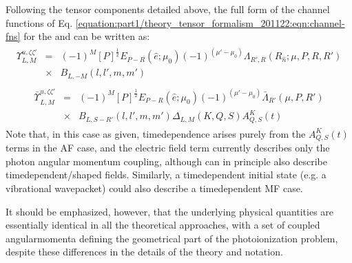 \documentclass[letterpaper,table,10pt,english]{jupyterBook}
\begin{document}
\sphinxAtStartPar
Following the tensor components detailed above, the full form of the channel functions of Eq. \eqref{equation:part1/theory_tensor_formalism_201122:eqn:channel-fns} for the {\hyperref[\detokenize{backmatter/glossary:term-AF}]{}} and {\hyperref[\detokenize{backmatter/glossary:term-MF}]{}} can be written as:
\begin{equation}\label{equation:part1/theory_tensor_formalism_201122:eq:channelFunc-MF-defn}
\begin{split}
\begin{aligned}
\varUpsilon_{L,M}^{u,\zeta\zeta'} & = & (-1)^{M}{[P]^{\frac{1}{2}}}E_{P-R}(\hat{e};\mu_{0})(-1)^{(\mu'-\mu_{0})}\Lambda_{R',R}(R_{\hat{n}};\mu,P,R,R')\\
 & \times & B_{L,-M}(l,l',m,m')\end{aligned}
\end{split}
\end{equation}\begin{equation}\label{equation:part1/theory_tensor_formalism_201122:eq:channelFunc-AF-defn}
\begin{split}
\begin{aligned}
\bar{\varUpsilon_{}}_{L,M}^{u,\zeta\zeta'} & = & (-1)^{M}[P]^{\frac{1}{2}}E_{P-R}(\hat{e};\mu_{0})(-1)^{(\mu'-\mu_{0})}\bar{\Lambda}_{R'}(\mu,P,R')\\
 & \times & B_{L,S-R'}(l,l',m,m')\Delta_{L,M}(K,Q,S)A_{Q,S}^{K}(t)\end{aligned}
\end{split}
\end{equation}
\sphinxAtStartPar
Note that, in this case as given, time\sphinxhyphen{}dependence arises purely from the
\(A_{Q,S}^{K}(t)\) terms in the AF case, and the electric field term
currently describes only the photon angular momentum coupling, although
can in principle also describe time\sphinxhyphen{}dependent/shaped fields. Similarly,
a time\sphinxhyphen{}dependent initial state (e.g. a vibrational wavepacket) could
also describe a time\sphinxhyphen{}dependent MF case.

\sphinxAtStartPar
It should be emphasized, however, that the underlying physical
quantities are essentially identical in all the theoretical approaches,
with a set of coupled angular\sphinxhyphen{}momenta defining the geometrical part of
the photoionization problem, despite these differences in the details of
the theory and notation.
\end{document}
